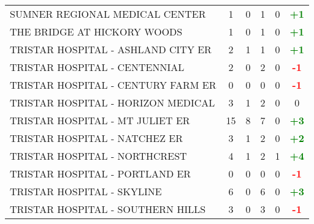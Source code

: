 \documentclass{article}
\begin{document}
\begin{longtable}{l|cccc|c}
    
        SUMNER REGIONAL MEDICAL CENTER & 1 & 0 & 1 & 0 & \textcolor{green}{\textbf{+1}} \\
    

    
        THE BRIDGE AT HICKORY WOODS & 1 & 0 & 1 & 0 & \textcolor{green}{\textbf{+1}} \\
    

    
        TRISTAR HOSPITAL - ASHLAND CITY ER & 2 & 1 & 1 & 0 & \textcolor{green}{\textbf{+1}} \\
    

    
        TRISTAR HOSPITAL - CENTENNIAL & 2 & 0 & 2 & 0 & \textcolor{red}{\textbf{-1}} \\
    

    
        TRISTAR HOSPITAL - CENTURY FARM ER & 0 & 0 & 0 & 0 & \textcolor{red}{\textbf{-1}} \\
    

    
        TRISTAR HOSPITAL - HORIZON MEDICAL & 3 & 1 & 2 & 0 & 0 \\
    

    
        TRISTAR HOSPITAL - MT JULIET ER & 15 & 8 & 7 & 0 & \textcolor{green}{\textbf{+3}} \\
    

    
        TRISTAR HOSPITAL - NATCHEZ ER & 3 & 1 & 2 & 0 & \textcolor{green}{\textbf{+2}} \\
    

    
        TRISTAR HOSPITAL - NORTHCREST & 4 & 1 & 2 & 1 & \textcolor{green}{\textbf{+4}} \\
    

    
        TRISTAR HOSPITAL - PORTLAND ER & 0 & 0 & 0 & 0 & \textcolor{red}{\textbf{-1}} \\
    

    
        TRISTAR HOSPITAL - SKYLINE & 6 & 0 & 6 & 0 & \textcolor{green}{\textbf{+3}} \\
    

    
        TRISTAR HOSPITAL - SOUTHERN HILLS & 3 & 0 & 3 & 0 & \textcolor{red}{\textbf{-1}} \\
    


\end{longtable}
\end{document}
